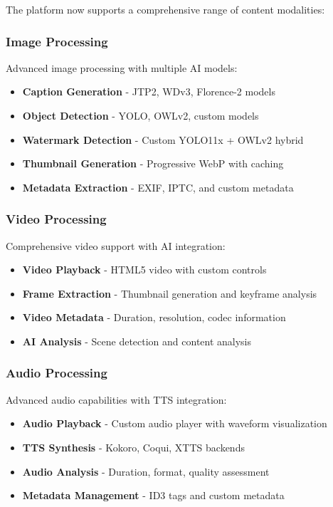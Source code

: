 \documentclass[11pt]{article}
\begin{document}
The platform now supports a comprehensive range of content modalities:

\subsubsection{Image Processing}

Advanced image processing with multiple AI models:

\begin{itemize}
\item \textbf{Caption Generation} - JTP2, WDv3, Florence-2 models
\item \textbf{Object Detection} - YOLO, OWLv2, custom models
\item \textbf{Watermark Detection} - Custom YOLO11x + OWLv2 hybrid
\item \textbf{Thumbnail Generation} - Progressive WebP with caching
\item \textbf{Metadata Extraction} - EXIF, IPTC, and custom metadata
\end{itemize}

\subsubsection{Video Processing}

Comprehensive video support with AI integration:

\begin{itemize}
\item \textbf{Video Playback} - HTML5 video with custom controls
\item \textbf{Frame Extraction} - Thumbnail generation and keyframe analysis
\item \textbf{Video Metadata} - Duration, resolution, codec information
\item \textbf{AI Analysis} - Scene detection and content analysis
\end{itemize}

\subsubsection{Audio Processing}

Advanced audio capabilities with TTS integration:

\begin{itemize}
\item \textbf{Audio Playback} - Custom audio player with waveform visualization
\item \textbf{TTS Synthesis} - Kokoro, Coqui, XTTS backends
\item \textbf{Audio Analysis} - Duration, format, quality assessment
\item \textbf{Metadata Management} - ID3 tags and custom metadata
\end{itemize}
\end{document}
